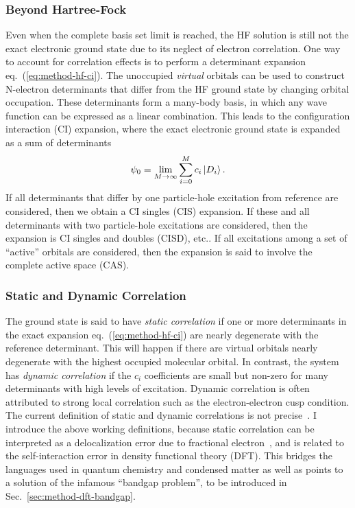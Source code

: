 \subsubsection{Beyond Hartree-Fock}
Even when the complete basis set limit is reached, the HF solution is still not the exact electronic ground state due to its neglect of electron correlation.
One way to account for correlation effects is to perform a determinant expansion eq.~(\ref{eq:method-hf-ci}).
The unoccupied \emph{virtual} orbitals can be used to construct N-electron determinants that differ from the HF ground state by changing orbital occupation.
These determinants form a many-body basis, in which any wave function can be expressed as a linear combination.
This leads to the configuration interaction (CI) expansion, where the exact electronic ground state is expanded as a sum of determinants
\begin{align} \label{eq:method-hf-ci}
\psi_0 = \lim\limits_{M\rightarrow\infty}\sum\limits_{i=0}^{M} c_i \ket{D_i}.
\end{align}
If all determinants that differ by one particle-hole excitation from reference are considered, then we obtain a CI singles (CIS) expansion. If these and all determinants with two particle-hole excitations are considered, then the expansion is CI singles and doubles (CISD), etc.. If all excitations among a set of ``active'' orbitals are considered, then the expansion is said to involve the complete active space (CAS).

\subsubsection{Static and Dynamic Correlation}
The ground state is said to have \textit{static correlation} if one or more determinants in the exact expansion eq.~(\ref{eq:method-hf-ci}) are nearly degenerate with the reference determinant.
This will happen if there are virtual orbitals nearly degenerate with the highest occupied molecular orbital.
In contrast, the system has \textit{dynamic correlation} if the $c_i$ coefficients are small but non-zero for many determinants with high levels of excitation.
Dynamic correlation is often attributed to strong local correlation such as the electron-electron cusp condition.
The current definition of static and dynamic correlations is not precise~\cite{Benavides-Riveros2017}.
I introduce the above working definitions, because static correlation can be interpreted as a delocalization error due to fractional electron~\cite{Cohen2008}, and is related to the self-interaction error in density functional theory (DFT).
This bridges the languages used in quantum chemistry and condensed matter as well as points to a solution of the infamous ``bandgap problem'', to be introduced in  Sec.~\ref{sec:method-dft-bandgap}.

